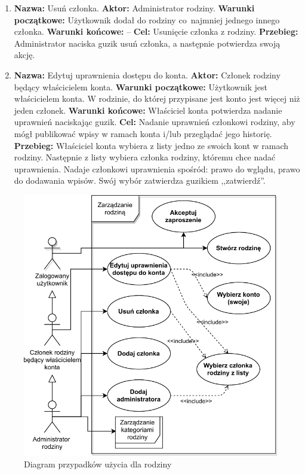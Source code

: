 \begin{enumerate}[labelwidth=1em,label=\arabic*.]
\item \textbf{Nazwa:} Usuń członka. \newline
    \textbf{Aktor:} Administrator rodziny. \newline
    \textbf{Warunki początkowe:} Użytkownik dodał do rodziny co~najmniej jednego innego członka. \newline
    \textbf{Warunki końcowe:} --  \newline
    \textbf{Cel:} Usunięcie członka z rodziny. \newline
    \textbf{Przebieg:} Administrator naciska guzik usuń członka, a następnie potwierdza swoją akcję.
\item \textbf{Nazwa:} Edytuj uprawnienia dostępu do konta. \newline
    \textbf{Aktor:} Członek rodziny będący właścicielem konta. \newline
    \textbf{Warunki początkowe:} Użytkownik jest właścicielem konta. W rodzinie, do której przypisane jest konto jest więcej niż jeden członek. \newline
    \textbf{Warunki końcowe:} Właściciel konta potwierdza nadanie uprawnień naciskając guzik. \newline
    \textbf{Cel:} Nadanie uprawnień członkowi rodziny, aby mógł publikować wpisy w ramach konta i/lub przeglądać jego historię.  \newline
    \textbf{Przebieg:} Właściciel konta wybiera z listy jedno ze swoich kont w ramach rodziny. Następnie z listy wybiera członka rodziny, któremu chce nadać uprawnienia. Nadaje członkowi uprawnienia spośród: prawo do wglądu, prawo do dodawania wpisów.
    Swój wybór zatwierdza guzikiem ,,zatwierdź''.
\end{enumerate}

\begin{figure}[t]
	\centering
	\includegraphics[width=.65\linewidth]{rys03/use-case-family-2.pdf}
	\caption{Diagram przypadków użycia dla rodziny}
	\label{fig:use-case-family}
\end{figure}

